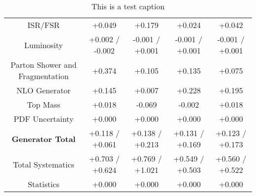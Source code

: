 \begin{table}[htbp]
\begin{center}
\begin{tabular}{|c|c|c|c|c|}
ISR/FSR                               &+0.049              & +0.179              & +0.024              & +0.042             \\
Luminosity                            &+0.002   / -0.002   & -0.001   / +0.001   & -0.001   / +0.001   & -0.001   / +0.001  \\
Parton Shower and Fragmentation       &+0.374              & +0.105              & +0.135              & +0.075             \\
NLO Generator                         &+0.145              & +0.007              & +0.228              & +0.195             \\
Top Mass                              &+0.018              & -0.069              & -0.002              & +0.018             \\
PDF Uncertainty                       &+0.000              & +0.000              & +0.000              & +0.000             \\
\hline
\textbf{Generator Total}              &+0.118   / +0.061   & +0.138   / +0.213   & +0.131   / +0.169   & +0.123   / +0.173  \\
\hline
\hline
Total Systematics                     &+0.703   / +0.624   & +0.769   / +1.021   & +0.549   / +0.503   & +0.560   / +0.522  \\
Statistics                            &+0.000              & +0.000              & +0.000              & +0.000             \\
\hline
  \end{tabular}
  \end{center} 
  \label{tab:fsm_nominal_sratio_high}
  \caption{This is a test caption}
\end{table}
 


